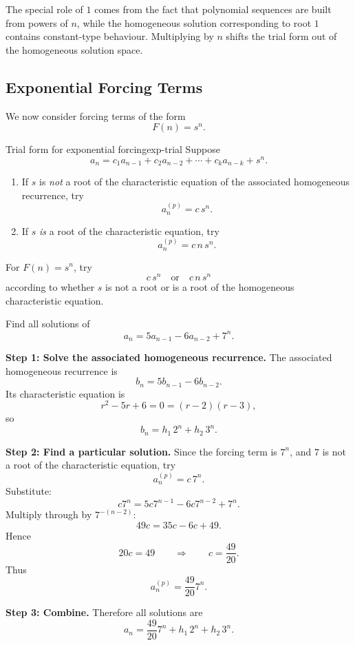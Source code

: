 \begin{extension}[title={Resonance viewpoint for polynomial forcing}]
The special role of \(1\) comes from the fact that polynomial sequences are built from powers of \(n\), while the homogeneous solution corresponding to root \(1\) contains constant-type behaviour. Multiplying by \(n\) shifts the trial form out of the homogeneous solution space.
\end{extension}

\subsection{Exponential Forcing Terms}

We now consider forcing terms of the form
\[
F(n)=s^n.
\]

\begin{theorem}{Trial form for exponential forcing}{exp-trial}
Suppose
\[
a_n=c_1a_{n-1}+c_2a_{n-2}+\cdots+c_ka_{n-k}+s^n.
\]

\begin{enumerate}[leftmargin=*]
    \item If \(s\) is \emph{not} a root of the characteristic equation of the associated homogeneous recurrence, try
    \[
    a_n^{(p)}=c\,s^n.
    \]
    \item If \(s\) \emph{is} a root of the characteristic equation, try
    \[
    a_n^{(p)}=c\,n\,s^n.
    \]
\end{enumerate}
\end{theorem}

\begin{keyformula}[title={Exponential forcing rule}]
For \(F(n)=s^n\), try
\[
c\,s^n
\quad\text{or}\quad
c\,n\,s^n
\]
according to whether \(s\) is not a root or is a root of the homogeneous characteristic equation.
\end{keyformula}
\begin{examplebox}[title={Example 11 from the handout}]
Find all solutions of
\[
a_n=5a_{n-1}-6a_{n-2}+7^n.
\]

\textbf{Step 1: Solve the associated homogeneous recurrence.}
The associated homogeneous recurrence is
\[
b_n=5b_{n-1}-6b_{n-2}.
\]
Its characteristic equation is
\[
r^2-5r+6=0=(r-2)(r-3),
\]
so
\[
b_n=h_1\,2^n+h_2\,3^n.
\]

\textbf{Step 2: Find a particular solution.}
Since the forcing term is \(7^n\), and \(7\) is not a root of the characteristic equation, try
\[
a_n^{(p)}=c\,7^n.
\]
Substitute:
\[
c7^n=5c7^{n-1}-6c7^{n-2}+7^n.
\]
Multiply through by \(7^{-(n-2)}\):
\[
49c=35c-6c+49.
\]
Hence
\[
20c=49
\qquad\Longrightarrow\qquad
c=\frac{49}{20}.
\]
Thus
\[
a_n^{(p)}=\frac{49}{20}7^n.
\]

\textbf{Step 3: Combine.}
Therefore all solutions are
\[
\boxed{
a_n=\frac{49}{20}7^n+h_1\,2^n+h_2\,3^n.
}
\]
\end{examplebox}

